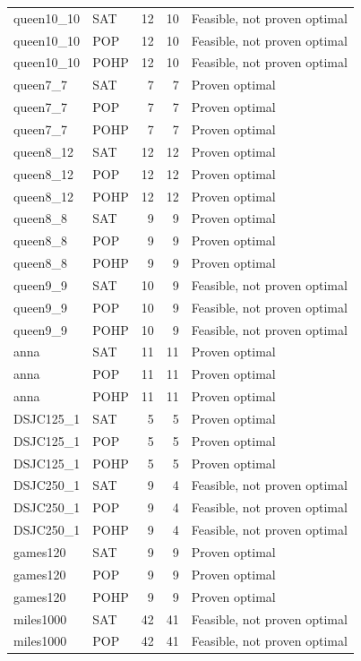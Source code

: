 \begin{longtable}{llrrl}
queen10\_10 & SAT & 12 & 10 & Feasible, not proven optimal \\
queen10\_10 & POP & 12 & 10 & Feasible, not proven optimal \\
queen10\_10 & POHP & 12 & 10 & Feasible, not proven optimal \\
queen7\_7 & SAT & 7 & 7 & Proven optimal \\
queen7\_7 & POP & 7 & 7 & Proven optimal \\
queen7\_7 & POHP & 7 & 7 & Proven optimal \\
queen8\_12 & SAT & 12 & 12 & Proven optimal \\
queen8\_12 & POP & 12 & 12 & Proven optimal \\
queen8\_12 & POHP & 12 & 12 & Proven optimal \\
queen8\_8 & SAT & 9 & 9 & Proven optimal \\
queen8\_8 & POP & 9 & 9 & Proven optimal \\
queen8\_8 & POHP & 9 & 9 & Proven optimal \\
queen9\_9 & SAT & 10 & 9 & Feasible, not proven optimal \\
queen9\_9 & POP & 10 & 9 & Feasible, not proven optimal \\
queen9\_9 & POHP & 10 & 9 & Feasible, not proven optimal \\
anna & SAT & 11 & 11 & Proven optimal \\
anna & POP & 11 & 11 & Proven optimal \\
anna & POHP & 11 & 11 & Proven optimal \\
DSJC125\_1 & SAT & 5 & 5 & Proven optimal \\
DSJC125\_1 & POP & 5 & 5 & Proven optimal \\
DSJC125\_1 & POHP & 5 & 5 & Proven optimal \\
DSJC250\_1 & SAT & 9 & 4 & Feasible, not proven optimal \\
DSJC250\_1 & POP & 9 & 4 & Feasible, not proven optimal \\
DSJC250\_1 & POHP & 9 & 4 & Feasible, not proven optimal \\
games120 & SAT & 9 & 9 & Proven optimal \\
games120 & POP & 9 & 9 & Proven optimal \\
games120 & POHP & 9 & 9 & Proven optimal \\
miles1000 & SAT & 42 & 41 & Feasible, not proven optimal \\
miles1000 & POP & 42 & 41 & Feasible, not proven optimal \\

\end{longtable}
